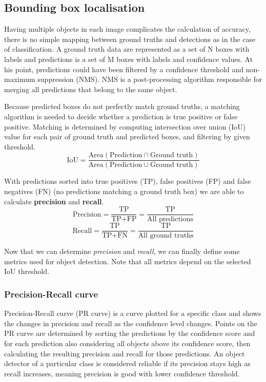 \subsection*{Bounding box localisation}
Having multiple objects in each image complicates the calculation of accuracy, there is no simple mapping between ground truths and detections as in the case of classification. A ground truth data are represented as a set of N boxes with labels and predictions is a set of M boxes with labels and confidence values. At his point, predictions could have been filtered by a confidence threshold and non-maximum suppression (NMS). NMS is a post-processing algorithm responsible for merging all predictions that belong to the same object. 

Because predicted boxes do not perfectly match ground truths, a matching algorithm is needed to decide whether a prediction is true positive or false positive. Matching is determined by computing intersection over union (IoU) value for each pair of ground truth and predicted boxes, and filtering by given threshold.
$$\text{IoU} = \frac{\text{Area}(\text{Prediction} \cap \text{Ground truth})}{\text{Area}(\text{Prediction} \cup \text{Ground truth})}$$

With predictions sorted into true positives (TP), false positives (FP) and false negatives (FN) (no predictions matching a ground truth box) we are able to calculate \textbf{precision} and \textbf{recall}.
$$\text{Precision} = \frac{\text{TP}}{\text{TP}+\text{FP}} = \frac{\text{TP}}{\text{All predictions}}$$
$$\text{Recall} = \frac{\text{TP}}{\text{TP}+\text{FN}} = \frac{\text{TP}}{\text{All ground truths}}$$

Now that we can determine \textit{precision} and \textit{recall}, we can finally define some metrics used for object detection. Note that all metrics depend on the selected IoU threshold.

\subsubsection{Precision-Recall curve}
Precision-Recall curve (PR curve) is a curve plotted for a specific class and shows the changes in precision and recall as the confidence level changes. Points on the PR curve are determined by sorting the predictions by the confidence score and for each prediction also considering all objects above its confidence score, then calculating the resulting precision and recall for those predictions. An object detector of a particular class is considered reliable if its precision stays high as recall increases, meaning precision is good with lower confidence threshold.

